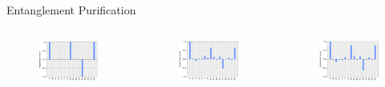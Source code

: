 \begin{frame}{Entanglement Purification}
\begin{columns}
	\begin{figure}
		\includegraphics[width=1\linewidth]{images/results/swap_pauli_sim.png}
	\end{figure}
	\begin{figure}
		\includegraphics[width=1\linewidth]{images/results/swap_pauli_dev.png}
	\end{figure}	
	\begin{figure}
		\includegraphics[width=1\linewidth]{images/results/swap_pauli_cal.png}

\end{figure}
\end{columns}
\end{frame}
